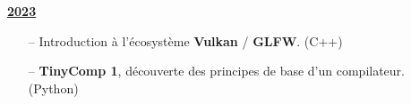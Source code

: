 \documentclass[10pt]{article}
\newcommand\tab[1][1cm]{\hspace*{#1}}
\begin{document}
	
	
	\underline{\textbf{\large{2023}}}
	\\[-0.6cm]	
	
	\begin{itemize}[itemsep = -0.75 mm]
			\item[--] \noindent Introduction à l'écosystème \textbf{Vulkan} / \textbf{GLFW}. (C++)
			\item[--] \noindent \textbf{TinyComp 1}, découverte des principes de base d'un compilateur. (Python)
	\end{itemize}
	
	
	
\end{document}
